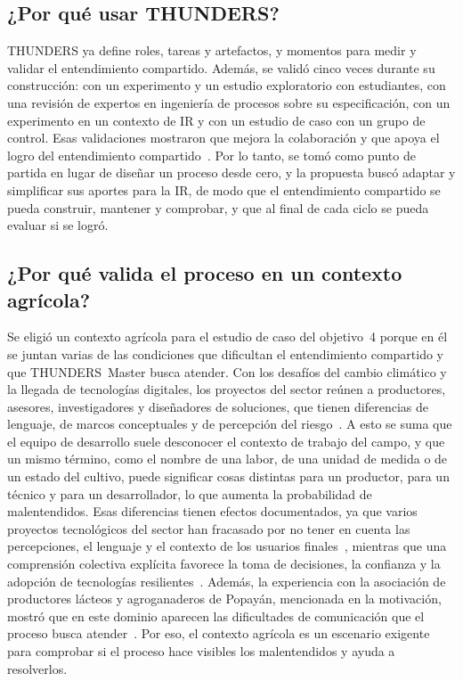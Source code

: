 \documentclass[12pt,letterpaper,oneside]{report}
\begin{document}
\subsection{¿Por qué usar THUNDERS?}
THUNDERS ya define roles, tareas y artefactos, y momentos para medir y
validar el entendimiento compartido. Además, se validó cinco veces durante su
construcción: con un experimento y un estudio exploratorio con estudiantes, con
una revisión de expertos en ingeniería de procesos sobre su especificación, con
un experimento en un contexto de IR y con un estudio de caso con un grupo de
control. Esas validaciones mostraron que mejora la colaboración y que apoya el
logro del entendimiento
compartido~\cite{agredo2022thesis,agredo2022exploratory,agredo2023validating}.
Por lo tanto, se tomó como punto de partida en lugar de diseñar un proceso desde
cero, y la propuesta buscó adaptar y simplificar sus aportes para la IR, de modo
que el entendimiento compartido se pueda construir,
mantener y comprobar, y que al final de cada ciclo se pueda evaluar si se logró.

\subsection{¿Por qué valida el proceso en un contexto agrícola?}
\label{sec:contexto_agricola}
Se eligió un contexto agrícola para el estudio de caso del objetivo~4 porque en
él se juntan varias de las condiciones que dificultan el entendimiento
compartido y que THUNDERS~Master busca atender. Con los desafíos del cambio
climático y la llegada de tecnologías digitales, los proyectos del sector reúnen
a productores, asesores, investigadores y diseñadores de soluciones, que tienen
diferencias de lenguaje, de marcos conceptuales y de percepción del
riesgo~\cite{getson2022communication}. A esto se suma que el equipo de
desarrollo suele desconocer el contexto de trabajo del campo, y que un mismo
término, como el nombre de una labor, de una unidad de medida o de un estado del
cultivo, puede significar cosas distintas para un productor, para un técnico y
para un desarrollador, lo que aumenta la probabilidad de malentendidos. Esas
diferencias tienen efectos documentados, ya que varios proyectos tecnológicos
del sector han fracasado por no tener en cuenta las percepciones, el lenguaje y
el contexto de los usuarios finales~\cite{lopez2021crowdre}, mientras que una
comprensión colectiva explícita favorece la toma de decisiones, la confianza y
la adopción de tecnologías resilientes~\cite{sulaiman2021ict}. Además, la
experiencia con la asociación de productores lácteos y agroganaderos de
Popayán, mencionada en la motivación, mostró que en este dominio aparecen las
dificultades de comunicación que el proceso busca
atender~\cite{agredo2023strategy}. Por eso, el contexto agrícola es un escenario
exigente para comprobar si el proceso hace visibles los malentendidos y ayuda a
resolverlos.
\end{document}
